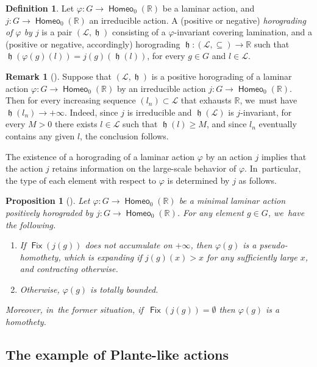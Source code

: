 \documentclass[10pt]{amsart}
\let\Subsection\subsection
\newtheorem{prop}[thm]{Proposition}
\theoremstyle{definition}
\newtheorem{dfn}[thm]{Definition}
\newtheorem{rem}[thm]{Remark}
\DeclareMathOperator{\Fix}{\mathsf{Fix}}\let\fix\Fix
\DeclareMathOperator{\homeo}{\mathsf{Homeo}}
\DeclareMathOperator{\hor}{\mathfrak{h}}
\newcommand{\R}{\mathbb{R}}
\newcommand{\Lcal}{\mathcal{L}}
\begin{document}
\begin{dfn}
Let $\varphi\colon G\to \homeo_0(\R)$ be a laminar action, and $j\colon G\to \homeo_0(\R)$ an irreducible action. A (positive or negative) \emph{horograding of $\varphi$ by $j$} is a pair $(\Lcal, \hor)$ consisting of a $\varphi$-invariant covering lamination, and a (positive or negative, accordingly) horograding $\hor\colon (\Lcal, \subseteq) \to \R$ such that $\hor(\varphi(g)(l))=j(g)(\hor(l))$, for every $g\in G$ and $l\in \Lcal$.
\end{dfn}

\begin{rem}[{\cite[Lem.\,8.2.7]{BMRT}}] \label{r-horograding-proper}
Suppose that $(\Lcal, \hor)$ is a positive horograding of a laminar action $\varphi\colon G\to \homeo_0(\R)$ by an irreducible action $j\colon G\to \homeo_0(\R)$. Then for every increasing sequence $(l_n)\subset \Lcal$ that exhausts $\R$, we~must have $\hor(l_n)\to +\infty$. Indeed, since $j$ is irreducible and $\hor(\Lcal)$ is $j$-invariant, for every $M>0$ there exists $l\in \Lcal$ such that $\hor(l)\ge M$, and since $l_n$ eventually contains any given $l$, the conclusion follows.
\end{rem}

The existence of a horograding of a laminar action $\varphi$ by an action $j$ implies that the action $j$ retains information on the large-scale behavior of $\varphi$. In~particular, the type of each element with respect to $\varphi$ is determined by $j$ as follows.

\begin{prop}[{\cite[Prop.\,8.2.10]{BMRT}}]\label{p-classification-elements} Let $\varphi\colon G\to\homeo_0(\R)$ be a minimal laminar action positively horograded by $j\colon G\to\homeo_0(\R)$. For any element $g\in G$, we~have the following.
\begin{enumerate}
\item \label{i-pseudo-homothety} If $\Fix(j(g))$ does not accumulate on $+\infty$, then $\varphi(g)$ is a pseudo-homothety, which is expanding if $j(g)(x)>x$ for any sufficiently large $x$, and contracting otherwise.
\item Otherwise, $\varphi(g)$ is totally bounded.
\end{enumerate}
Moreover, in~the former situation, if~$\Fix(j(g))=\emptyset$ then $\varphi(g)$ is a homothety.
\end{prop}

\setcounter{thm}{9}
\Subsection{The example of Plante-like actions} \label{s-plante-laminations}
\end{document}
